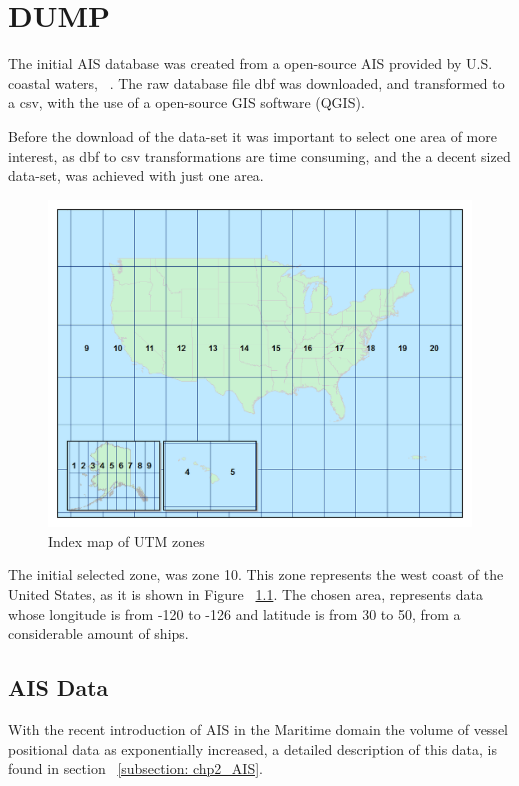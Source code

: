 \chapter{DUMP} %

The initial AIS database was created from a open-source AIS provided by U.S. coastal waters, ~\cite{MarineCadastre}. The raw database file dbf was downloaded, and transformed to a csv, with the use of a open-source GIS software (QGIS). 
 
Before the download of the data-set it was important to select one area of more interest, as dbf to csv transformations are time consuming, and the a decent sized data-set, was achieved with just one area.

\begin{figure}[H]
	\centering
	\includegraphics[scale = .35]{figures/UTMZoneMap2014.png}
    \caption{Index map of UTM zones}
    \label{fig: UMT zones}
\end{figure}

The initial selected zone, was zone 10. This zone represents the west coast of the United States, as it is shown in Figure ~\ref{fig: UMT zones}.
The chosen area, represents data whose longitude is from -120 to -126 and latitude is from 30 to 50, from a considerable amount of ships.


\section{AIS Data}
 With the recent introduction of AIS in the Maritime domain the volume of vessel positional data as exponentially increased, a detailed description of this data, is found in section ~\ref{subsection: chp2_AIS}.

